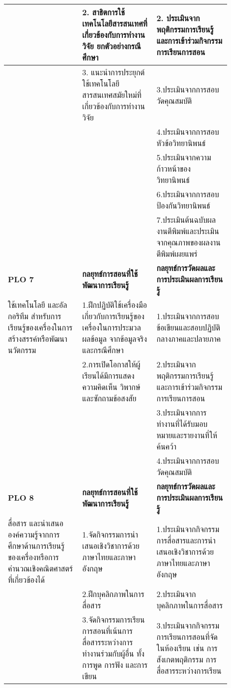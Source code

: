 \begin{landscape}
\begin{longtable}{|p{0.3\linewidth}|p{0.3\linewidth}|p{0.3\linewidth}|}
 \hline
 & 2. สาธิตการใช้เทคโนโลยีสารสนเทศที่เกี่ยวข้องกับการทำงานวิจัย ยกตัวอย่างกรณีศึกษา & 2. ประเมินจากพฤติกรรมการเรียนรู้ และการเข้าร่วมกิจกรรมการเรียนการสอน \\
 \hline
 & 3. แนะนำการประยุกต์ใช้เทคโนโลยีสารสนเทศสมัยใหม่ที่เกี่ยวข้องกับการทำงานวิจัย & 3.ประเมินจากการสอบวัดคุณสมบัติ\\
 \hline
 & & 4.ประเมินจากการสอบหัวข้อวิทยานิพนธ์\\
 \hline
 & & 5.ประเมินจากความก้าวหน้าของวิทยานิพนธ์\\
 \hline
 & & 6.ประเมินจากการสอบป้องกันวิทยานิพนธ์\\
 \hline
 & & 7.ประเมินต้นฉบับผลงานตีพิมพ์และประเมินจากคุณภาพของผลงานตีพิมพ์เผยแพร่\\
 \hline
 \textbf{PLO 7} & \textbf{กลยุทธ์การสอนที่ใช้พัฒนาการเรียนรู้} & \textbf{กลยุทธ์การวัดผลและการประเมินผลการเรียนรู้} \\ 
 \hline
 ใช้เทคโนโลยี และอัลกอริทึม สำหรับการเรียนรู้ของเครื่องในการสร้างสรรค์หรือพัฒนานวัตกรรม & 1.ฝึกปฏิบัติใช้เครื่องมือเกี่ยวกับการเรียนรู้ของเครื่องในการประมวลผลข้อมูล จากข้อมูลจริง และกรณีศึกษา & 1.ประเมินจากการสอบข้อเขียนและสอบปฏิบัติกลางภาคและปลายภาค \\
 \hline
  & 2.การเปิดโอกาสให้ผู้เรียนได้มีการแสดงความคิดเห็น วิพากษ์และซักถามข้อสงสัย & 2.ประเมินจากพฤติกรรมการเรียนรู้ และการเข้าร่วมกิจกรรมการเรียนการสอน \\
 \hline
 & & 3.ประเมินจากการทำงานที่ได้รับมอบหมายและรายงานที่ให้ค้นคว้า \\
 \hline
 & & 4.ประเมินจากการสอบวัดคุณสมบัติ \\
 \hline
 \textbf{PLO 8} & \textbf{กลยุทธ์การสอนที่ใช้พัฒนาการเรียนรู้} & \textbf{กลยุทธ์การวัดผลและการประเมินผลการเรียนรู้} \\ 
 \hline
 สื่อสาร และนำเสนอ องค์ความรู้จากการศึกษาด้านการเรียนรู้ของเครื่องหรือการคำนวณเชิงคณิตศาสตร์ที่เกี่ยวข้องได้ & 1.จัดกิจกรรมการนำเสนอเชิงวิชาการด้วยภาษาไทยและภาษาอังกฤษ & 1.ประเมินจากกิจกรรมการสื่อสารและการนำเสนอเชิงวิชาการด้วยภาษาไทยและภาษาอังกฤษ \\
 \hline
 & 2.ฝึกบุคลิกภาพในการสื่อสาร & 2.ประเมินจากบุคลิกภาพในการสื่อสาร \\
 \hline
 & 3.จัดกิจกรรมการเรียนการสอนที่เน้นการสื่อสารระหว่างการทำงานร่วมกับผู้อื่น ทั้งการพูด การฟัง และการเขียน & 3.ประเมินจากกิจกรรมการเรียนการสอนที่จัดในห้องเรียน เช่น การสังเกตพฤติกรรม การสื่อสารระหว่างการเรียน \\ \hline


\end{longtable}
\end{landscape}

